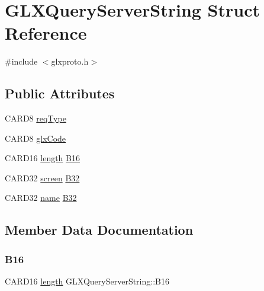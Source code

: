 \hypertarget{struct_g_l_x_query_server_string}{}\section{G\+L\+X\+Query\+Server\+String Struct Reference}
\label{struct_g_l_x_query_server_string}


{\ttfamily \#include $<$glxproto.\+h$>$}

\subsection*{Public Attributes}
\begin{DoxyCompactItemize}
\item 
C\+A\+R\+D8 \hyperlink{struct_g_l_x_query_server_string_abf48eb4fb48112f5b67278ecd69f03c4}{req\+Type}
\item 
C\+A\+R\+D8 \hyperlink{struct_g_l_x_query_server_string_a5b61b50974286f572a1c9d6963c89c57}{glx\+Code}
\item 
C\+A\+R\+D16 \hyperlink{glcorearb_8h_ab9c919755bde3b34349e23a32b4e0fa7}{length} \hyperlink{struct_g_l_x_query_server_string_a74ddd15d764dfe644a9cb2165afa855b}{B16}
\item 
C\+A\+R\+D32 \hyperlink{cad_8h_ae04e09e4e3831bfc1632c509ae37dcec}{screen} \hyperlink{struct_g_l_x_query_server_string_aa759f4c7b845a0515a5d988f243d0522}{B32}
\item 
C\+A\+R\+D32 \hyperlink{glcorearb_8h_aaced7cfc21e7d37775d6921bb8177239}{name} \hyperlink{struct_g_l_x_query_server_string_a587dcd6655e7495dbf6c934dde81f42a}{B32}
\end{DoxyCompactItemize}


\subsection{Member Data Documentation}
\mbox{\label{struct_g_l_x_query_server_string_a74ddd15d764dfe644a9cb2165afa855b}} 
\subsubsection{\texorpdfstring{B16}{B16}}
{\footnotesize\ttfamily C\+A\+R\+D16 \hyperlink{glcorearb_8h_ab9c919755bde3b34349e23a32b4e0fa7}{length} G\+L\+X\+Query\+Server\+String\+::\+B16}


